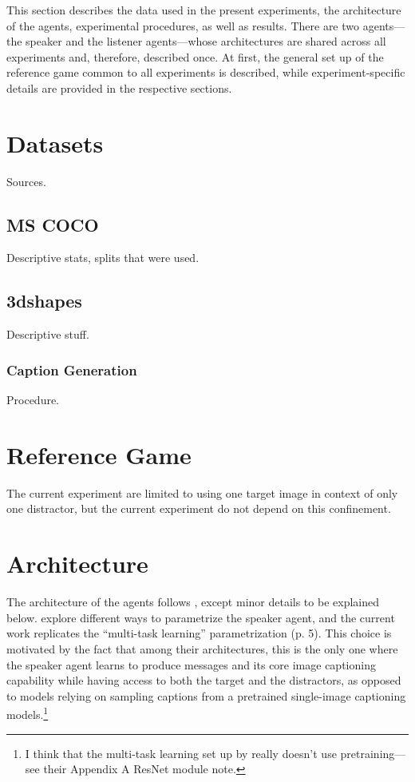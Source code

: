 This section describes the data used in the present experiments, the architecture of the agents, experimental procedures, as well as results. There are two agents---the speaker and the listener agents---whose architectures are shared across all experiments and, therefore, described once. At first, the general set up of the reference game common to all experiments is described, while experiment-specific details are provided in the respective sections.  

\section{Datasets}

Sources.
\subsection{MS COCO}
Descriptive stats, splits that were used.
\subsection{3dshapes}
Descriptive stuff.
\subsubsection{Caption Generation}
Procedure. 

\section{Reference Game}

The current experiment are limited to using one target image in context of only one distractor, but the current experiment do not depend on this confinement.

\section{Architecture}
The architecture of the agents follows \textcite{lazaridou2020multi}, except minor details to be explained below. \textcite{lazaridou2020multi} explore different ways to parametrize the speaker agent, and the current work replicates the ``multi-task learning'' parametrization (p. 5). This choice is motivated by the fact that among their architectures, this is the only one where the speaker agent learns to produce messages and its core image captioning capability while having access to both the target and the distractors, as opposed to models relying on sampling captions from a pretrained single-image captioning models.\footnote{I think that the multi-task learning set up by \textcite{lazaridou2020multi} really doesn't use pretraining---see their Appendix A ResNet module note.} 

